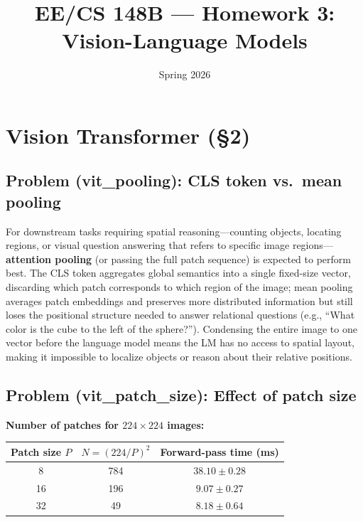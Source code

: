 \documentclass[11pt]{article}
\title{\textbf{EE/CS 148B --- Homework 3: Vision-Language Models}}
\date{Spring 2026}
\begin{document}
\maketitle

\section{Vision Transformer (\S2)}

\subsection*{Problem (vit\_pooling): CLS token vs.\ mean pooling}

For downstream tasks requiring spatial reasoning---counting objects, locating regions, or visual question answering that refers to specific image regions---\textbf{attention pooling} (or passing the full patch sequence) is expected to perform best. The CLS token aggregates global semantics into a single fixed-size vector, discarding which patch corresponds to which region of the image; mean pooling averages patch embeddings and preserves more distributed information but still loses the positional structure needed to answer relational questions (e.g., ``What color is the cube to the left of the sphere?''). Condensing the entire image to one vector before the language model means the LM has no access to spatial layout, making it impossible to localize objects or reason about their relative positions.

\subsection*{Problem (vit\_patch\_size): Effect of patch size}

\textbf{Number of patches for $224 \times 224$ images:}

\begin{center}
\begin{tabular}{ccc}
\toprule
Patch size $P$ & $N = (224/P)^2$ & Forward-pass time (ms) \\
\midrule
8  & 784 & $38.10 \pm 0.28$ \\
16 & 196 & $9.07 \pm 0.27$ \\
32 & 49  & $8.18 \pm 0.64$ \\
\bottomrule
\end{tabular}
\end{center}
\end{document}
